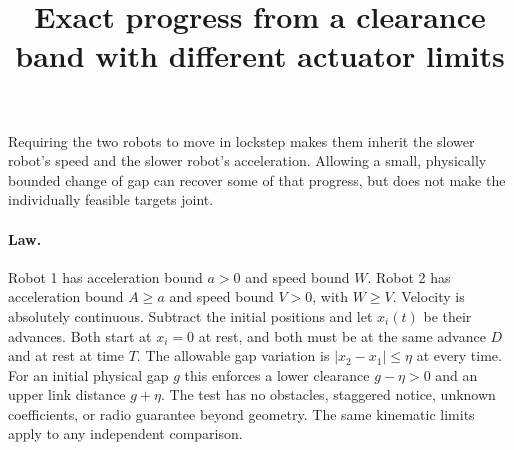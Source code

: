 \documentclass[11pt]{article}
\title{Exact progress from a clearance band with different actuator limits}
\begin{document}
\maketitle

Requiring the two robots to move in lockstep makes them inherit the
slower robot's speed and the slower robot's acceleration. Allowing a
small, physically bounded change of gap can recover some of that
progress, but does not make the individually feasible targets joint.

\paragraph{Law.}
Robot 1 has acceleration bound \(a>0\) and speed bound \(W\).
Robot 2 has acceleration bound \(A\ge a\) and speed bound
\(V>0\), with \(W\ge V\). Velocity is absolutely continuous.
Subtract the initial positions and let \(x_i(t)\) be their advances.
Both start at \(x_i=0\) at rest, and both must be at the same advance
\(D\) and at rest at time \(T\). The allowable gap variation is
\(|x_2-x_1|\le\eta\) at every time. For an initial physical gap \(g\)
this enforces a lower clearance \(g-\eta>0\) and an upper link
distance \(g+\eta\). The test has no obstacles, staggered notice,
unknown coefficients, or radio guarantee beyond geometry.
The same kinematic limits apply to any independent comparison.
\end{document}
